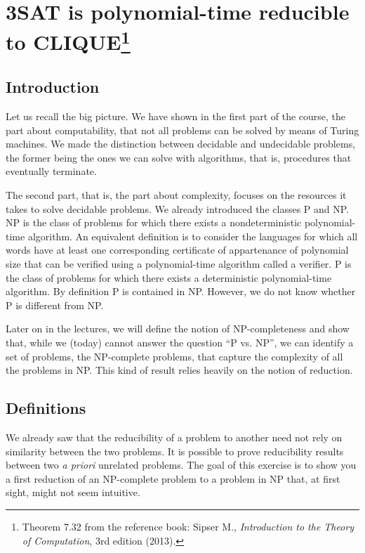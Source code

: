 \section{3SAT is polynomial-time reducible to CLIQUE\footnote{%
Theorem 7.32 from the reference book: Sipser M.,
\emph{Introduction to the Theory of Computation}, 3rd edition (2013).}}

\subsection{Introduction}

Let us recall the big picture. We have shown in the first part of the course,
the part about computability, that not all problems can be solved by means of
Turing machines. We made the distinction between decidable and undecidable
problems, the former being the ones we can solve with algorithms, that is,
procedures that eventually terminate.

The second part, that is, the part about complexity, focuses on the resources
it takes to solve decidable problems. We already introduced the classes P and
NP\@. NP is the class of problems for which there exists a nondeterministic
polynomial-time algorithm. An equivalent definition is to consider the
languages for which all words have at least one corresponding certificate of
appartenance of polynomial size that can be verified using a polynomial-time
algorithm called a verifier. P is the class of problems for which there exists
a deterministic polynomial-time algorithm. By definition P is contained in NP\@.
However, we do not know whether P is different from NP.

Later on in the lectures, we will define the notion of NP-completeness and show
that, while we (today) cannot answer the question ``P vs. NP'', we can identify
a set of problems, the NP-complete problems, that capture the complexity of all
the problems in NP\@. This kind of result relies heavily on the notion of
reduction.

\subsection{Definitions}

We already saw that the reducibility of a problem to
another need not rely on similarity between the two problems. It is
possible to prove reducibility results between two \emph{a priori} unrelated problems.
The goal of this exercise is to show you a first reduction of an NP-complete
problem to a problem in NP that, at first sight, might not seem intuitive.

